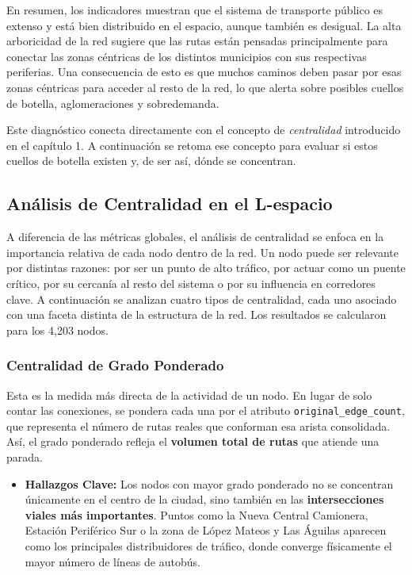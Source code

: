 	    En resumen, los indicadores muestran que el sistema de transporte público es extenso y está bien distribuido en el espacio, aunque también es desigual. La alta arboricidad de la red sugiere que las rutas están pensadas principalmente para conectar las zonas céntricas de los distintos municipios con sus respectivas periferias. Una consecuencia de esto es que muchos caminos deben pasar por esas zonas céntricas para acceder al resto de la red, lo que alerta sobre posibles cuellos de botella, aglomeraciones y sobredemanda.

            Este diagnóstico conecta directamente con el concepto de \textit{centralidad} introducido en el capítulo 1. A continuación se retoma ese concepto para evaluar si estos cuellos de botella existen y, de ser así, dónde se concentran.

        \subsection{Análisis de Centralidad en el L-espacio}
            A diferencia de las métricas globales, el análisis de centralidad se enfoca en la importancia relativa de cada nodo dentro de la red. Un nodo puede ser relevante por distintas razones: por ser un punto de alto tráfico, por actuar como un puente crítico, por su cercanía al resto del sistema o por su influencia en corredores clave. A continuación se analizan cuatro tipos de centralidad, cada uno asociado con una faceta distinta de la estructura de la red. Los resultados se calcularon para los 4,203 nodos.

        \subsubsection{Centralidad de Grado Ponderado}
            Esta es la medida más directa de la actividad de un nodo. En lugar de solo contar las conexiones, se pondera cada una por el atributo \texttt{original\_edge\_count}, que representa el número de rutas reales que conforman esa arista consolidada. Así, el grado ponderado refleja el \textbf{volumen total de rutas} que atiende una parada.
            \begin{itemize}
                \item \textbf{Hallazgos Clave:} Los nodos con mayor grado ponderado no se concentran únicamente en el centro de la ciudad, sino también en las \textbf{intersecciones viales más importantes}. Puntos como la Nueva Central Camionera, Estación Periférico Sur o la zona de López Mateos y Las Águilas aparecen como los principales distribuidores de tráfico, donde converge físicamente el mayor número de líneas de autobús.
            \end{itemize}

